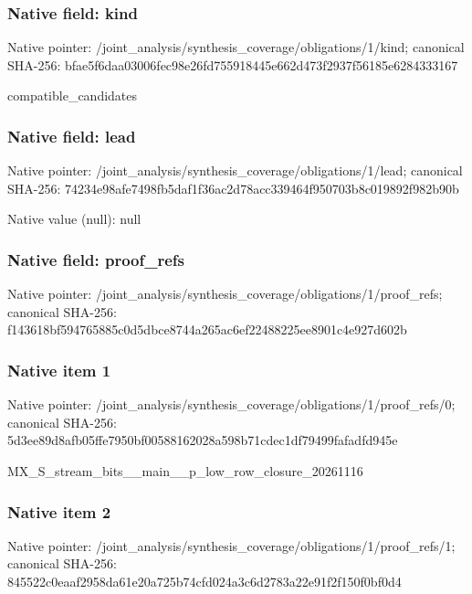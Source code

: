 \documentclass[10pt,a4paper]{article}
\begin{document}
\subsubsection{Native field: kind}
Native pointer: /joint\_\allowbreak{}analysis/synthesis\_\allowbreak{}coverage/obligations/1/kind; canonical SHA-256: bfae5f6daa03006fec98e26fd755918445e662d473f2937f56185e6284333167

\begingroup\raggedright\sloppy compatible\_\allowbreak{}candidates\par\endgroup

\subsubsection{Native field: lead}
Native pointer: /joint\_\allowbreak{}analysis/synthesis\_\allowbreak{}coverage/obligations/1/lead; canonical SHA-256: 74234e98afe7498fb5daf1f36ac2d78acc339464f950703b8c019892f982b90b

Native value (null): null

\subsubsection{Native field: proof\_\allowbreak{}refs}
Native pointer: /joint\_\allowbreak{}analysis/synthesis\_\allowbreak{}coverage/obligations/1/proof\_\allowbreak{}refs; canonical SHA-256: f143618bf594765885c0d5dbce8744a265ac6ef22488225ee8901c4e927d602b

\subsubsection{Native item 1}
Native pointer: /joint\_\allowbreak{}analysis/synthesis\_\allowbreak{}coverage/obligations/1/proof\_\allowbreak{}refs/0; canonical SHA-256: 5d3ee89d8afb05ffe7950bf00588162028a598b71cdec1df79499fafadfd945e

\begingroup\raggedright\sloppy MX\_\allowbreak{}S\_\allowbreak{}stream\_\allowbreak{}bits\_\allowbreak{}\_\allowbreak{}main\_\allowbreak{}\_\allowbreak{}p\_\allowbreak{}low\_\allowbreak{}row\_\allowbreak{}closure\_\allowbreak{}20261116\par\endgroup

\subsubsection{Native item 2}
Native pointer: /joint\_\allowbreak{}analysis/synthesis\_\allowbreak{}coverage/obligations/1/proof\_\allowbreak{}refs/1; canonical SHA-256: 845522c0eaaf2958da61e20a725b74cfd024a3c6d2783a22e91f2f150f0bf0d4
\end{document}
